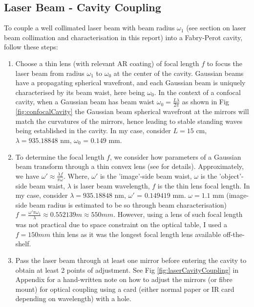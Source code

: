 \documentclass[12pt]{report}
\begin{document}
\subsection{Laser Beam - Cavity Coupling}
To couple a well collimated laser beam with beam radius $\omega_1$ (see section on laser beam collimation and characterisation in this report) into a Fabry-Perot cavity, follow these steps: 
\begin{enumerate}
    \item Choose a thin lens (with relevant AR coating) of focal length $f$ to focus the laser beam from radius $\omega_1$ to $\omega_0$ at the center of the cavity. Gaussian beams have a propagating spherical wavefront, and each Gaussian beam is uniquely characterised by its beam waist, here being $\omega_0$. In the context of a confocal cavity, when a Gaussian beam has beam waist $\omega_0 = \frac{L\lambda}{2\pi}$ as shown in Fig \ref{fig:confocalCavity} the Gaussian beam spherical wavefront at the mirrors will match the curvatures of the mirrors, hence leading to stable standing waves being established in the cavity. In my case, consider $L=15$ cm, $\lambda = 935.18848$ nm,  $\omega_0$ = $0.149$ mm.
    
    \item To determine the focal length $f$, we consider how parameters of a Gaussian beam transform through a thin convex lens (see \cite{principleOfLasersOrazio} for details). Approximately, we have $\omega' \approx \frac{\lambda f}{\pi \omega}$. Where, $\omega'$ is the 'image'-side beam waist, $\omega$ is the 'object'-side beam waist, $\lambda$ is laser beam wavelength, $f$ is the thin lens focal length. In my case, consider $\lambda = 935.18848$ nm, $\omega'$ = $0.149419$ mm. $\omega = 1.1$ mm (image-side beam radius is estimated to be so through beam characterisation) $f = \frac{\omega' \pi \omega_1}{\lambda} \approx 0.552139m \approx 550mm$. However, using a lens of such focal length was not practical due to space constraint on the optical table, I used a $f=150mm$ thin lens as it was the longest focal length lens available off-the-shelf. 
    
    \item Pass the laser beam through at least one mirror before entering the cavity to obtain at least 2 points of adjustment. See Fig \ref{fig:laserCavityCoupling} in Appendix for a hand-written note on how to adjust the mirrors (or fibre mount) for optical coupling using a card (either normal paper or IR card depending on wavelength) with a hole. 


\end{enumerate}
\end{document}
